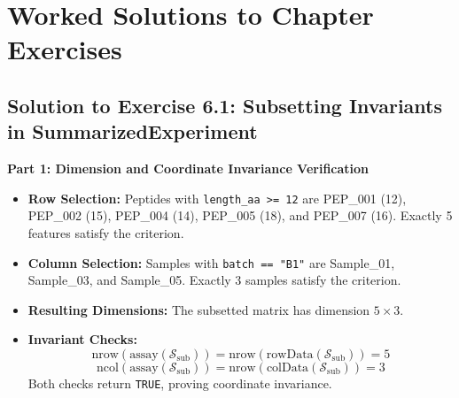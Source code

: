 \documentclass[11pt,twoside,openright]{book}
\begin{document}
\FloatBarrier

\section{Worked Solutions to Chapter Exercises}
\label{sec:solutions}

\subsection{Solution to Exercise 6.1: Subsetting Invariants in SummarizedExperiment}
\noindent\textbf{Part 1: Dimension and Coordinate Invariance Verification}\enspace
\begin{itemize}
    \item \textbf{Row Selection:} Peptides with \texttt{length\_aa >= 12} are PEP\_001 (12), PEP\_002 (15), PEP\_004 (14), PEP\_005 (18), and PEP\_007 (16). Exactly 5 features satisfy the criterion.
    \item \textbf{Column Selection:} Samples with \texttt{batch == "B1"} are Sample\_01, Sample\_03, and Sample\_05. Exactly 3 samples satisfy the criterion.
    \item \textbf{Resulting Dimensions:} The subsetted matrix has dimension $5 \times 3$.
    \item \textbf{Invariant Checks:}
    \begin{equation}
    \text{nrow}(\text{assay}(\mathcal{S}_{\text{sub}})) = \text{nrow}(\text{rowData}(\mathcal{S}_{\text{sub}})) = 5
    \end{equation}
    \begin{equation}
    \text{ncol}(\text{assay}(\mathcal{S}_{\text{sub}})) = \text{nrow}(\text{colData}(\mathcal{S}_{\text{sub}})) = 3
    \end{equation}
    Both checks return \texttt{TRUE}, proving coordinate invariance.
\end{itemize}
\end{document}
